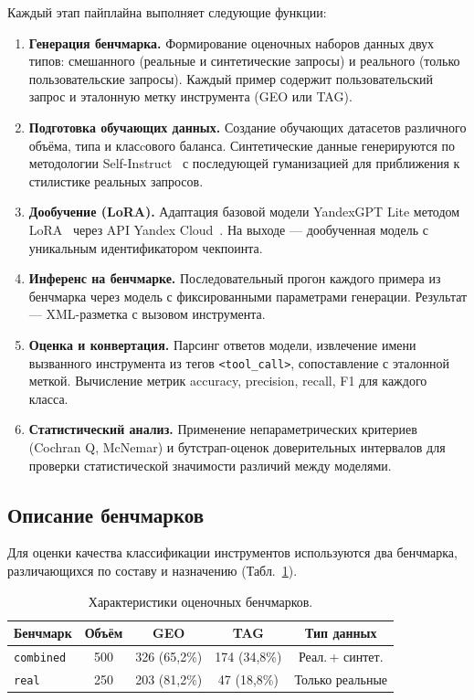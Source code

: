 \noindent Каждый этап пайплайна выполняет следующие функции:
\begin{enumerate}
    \item \textbf{Генерация бенчмарка.} Формирование оценочных наборов данных двух типов: смешанного (реальные и синтетические запросы) и реального (только пользовательские запросы). Каждый пример содержит пользовательский запрос и эталонную метку инструмента (GEO или TAG).
    \item \textbf{Подготовка обучающих данных.} Создание обучающих датасетов различного объёма, типа и класcового баланса. Синтетические данные генерируются по методологии Self-Instruct~\cite{wang2023selfinstruct} с последующей гуманизацией для приближения к стилистике реальных запросов.
    \item \textbf{Дообучение (LoRA).} Адаптация базовой модели YandexGPT Lite методом LoRA~\cite{hu2022lora} через API Yandex Cloud~\cite{yandexgpt2024docs}. На выходе --- дообученная модель с уникальным идентификатором чекпоинта.
    \item \textbf{Инференс на бенчмарке.} Последовательный прогон каждого примера из бенчмарка через модель с фиксированными параметрами генерации. Результат --- XML-разметка с вызовом инструмента.
    \item \textbf{Оценка и конвертация.} Парсинг ответов модели, извлечение имени вызванного инструмента из тегов \texttt{<tool\_call>}, сопоставление с эталонной меткой. Вычисление метрик accuracy, precision, recall, F1 для каждого класса.
    \item \textbf{Статистический анализ.} Применение непараметрических критериев (Cochran Q, McNemar) и бутстрап-оценок доверительных интервалов для проверки статистической значимости различий между моделями.
\end{enumerate}

\subsection{Описание бенчмарков} \label{subsec:benchmarks}

Для оценки качества классификации инструментов используются два бенчмарка, различающихся по составу и назначению (Табл.~\ref{tab:benchmarks}).

\begin{table}[H]
\centering
\caption{Характеристики оценочных бенчмарков.}
\label{tab:benchmarks}
\def\arraystretch{1.2}
\setlength\tabcolsep{0.4em}
\begin{tabular}{lcccc}
    \toprule
    Бенчмарк & Объём & GEO & TAG & Тип данных \\
    \midrule
    \texttt{combined} & 500 & 326 (65,2\%) & 174 (34,8\%) & Реал.\,+ синтет. \\
    \texttt{real}     & 250 & 203 (81,2\%) & 47 (18,8\%)  & Только реальные \\
    \bottomrule
\end{tabular}
\end{table}

